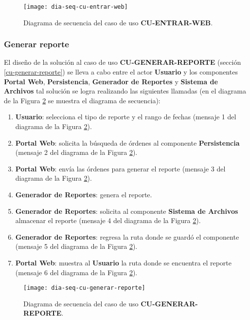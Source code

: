 \begin{figure}[h]
	\centering
	\texttt{[image: dia-seq-cu-entrar-web]}
	\caption{Diagrama de secuencia del caso de uso \textbf{CU-ENTRAR-WEB}.}
	\label{fig:dia-seq-cu-entrar-web}
\end{figure}

\subsubsection{Generar reporte}
El diseño de la solución al caso de uso \textbf{CU-GENERAR-REPORTE} (sección \ref{cu-generar-reporte}) se lleva a cabo entre el actor \textbf{Usuario} y los componentes \textbf{Portal Web}, \textbf{Persistencia}, \textbf{Generador de Reportes} y  \textbf{Sistema de Archivos} tal solución se logra realizando las siguientes llamadas (en el diagrama de la Figura \ref{fig:dia-seq-cu-generar-reporte} se muestra el diagrama de secuencia):
\begin{enumerate}
	\item \textbf{Usuario}: selecciona el tipo de reporte y el rango de fechas (mensaje 1 del diagrama de la Figura \ref{fig:dia-seq-cu-generar-reporte}).
	\item \textbf{Portal Web}: solicita la búsqueda de órdenes al componente \textbf{Persistencia} (mensaje 2 del diagrama de la Figura \ref{fig:dia-seq-cu-generar-reporte}).
	\item \textbf{Portal Web}: envía las órdenes para generar el reporte (mensaje 3 del diagrama de la Figura \ref{fig:dia-seq-cu-generar-reporte}).
	\item \textbf{Generador de Reportes}: genera el reporte.
	\item \textbf{Generador de Reportes}: solicita al componente \textbf{Sistema de Archivos} almacenar el reporte (mensaje 4 del diagrama de la Figura \ref{fig:dia-seq-cu-generar-reporte}).
	\item \textbf{Generador de Reportes}: regresa la ruta donde se guardó el componente (mensaje 5 del diagrama de la Figura \ref{fig:dia-seq-cu-generar-reporte}).
	\item \textbf{Portal Web}: muestra al \textbf{Usuario} la ruta donde se encuentra el reporte (mensaje 6 del diagrama de la Figura \ref{fig:dia-seq-cu-generar-reporte}).
\end{enumerate}

\begin{figure}[h]
	\centering
	\texttt{[image: dia-seq-cu-generar-reporte]}
	\caption{Diagrama de secuencia del caso de uso \textbf{CU-GENERAR-REPORTE}.}
	\label{fig:dia-seq-cu-generar-reporte}
\end{figure}

